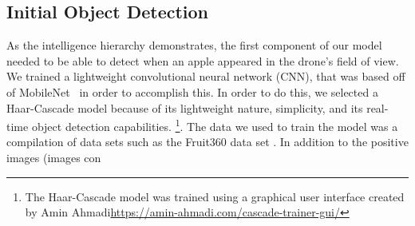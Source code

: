 \subsection{Initial Object Detection}
As the intelligence hierarchy demonstrates, the first component of our model needed to be able to detect when an apple appeared in the drone's field of view. 
We trained a lightweight convolutional neural network (CNN), that was based off of MobileNet~\cite{Sandler2018,PyTorchMobileNet} in order to accomplish this. 
In order to do this, we selected a Haar-Cascade model because of its lightweight nature, simplicity, and its real-time object detection capabilities.
\footnote{The Haar-Cascade model was trained using a graphical user interface created by Amin Ahmadi\url{https://amin-ahmadi.com/cascade-trainer-gui/}}. 
The data we used to train the model was a compilation of data sets such as the Fruit360 data set \cite{Fruit360}.
In addition to the positive images (images con